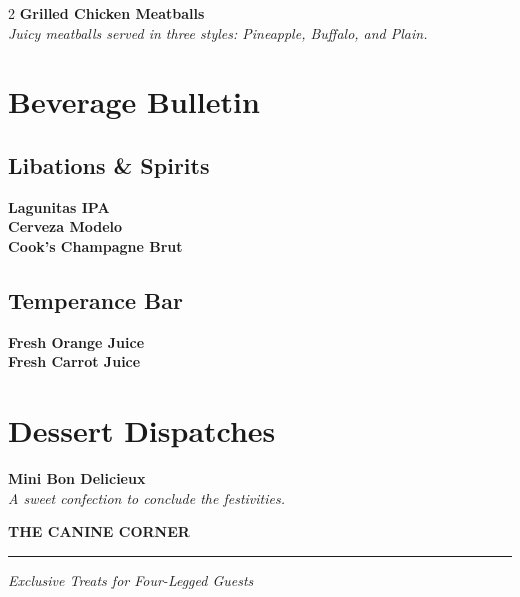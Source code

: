 \documentclass[a4paper,10pt]{article}
\begin{document}
\begin{multicols}{2}
    \vspace{0.1cm}
    \textbf{Grilled Chicken Meatballs} \\
    \textit{Juicy meatballs served in three styles: Pineapple, Buffalo, and Plain.}

    \vspace{0.4cm}

    \section{Beverage Bulletin}
    \vspace{0.2cm}

    \subsection{Libations & Spirits}
    \vspace{0.1cm}
    \textbf{Lagunitas IPA} \\
    \textbf{Cerveza Modelo} \\
    \textbf{Cook's Champagne Brut}

    \vspace{0.2cm}
    \subsection{Temperance Bar}
    \vspace{0.1cm}
    \textbf{Fresh Orange Juice} \\
    \textbf{Fresh Carrot Juice}

    \vspace{0.4cm}

    \section{Dessert Dispatches}
    \vspace{0.2cm}

    \textbf{Mini Bon Delicieux} \\
    \textit{A sweet confection to conclude the festivities.}

    \vspace{0.5cm}

    \begin{tcolorbox}[colback=white, colframe=black, sharp corners, boxrule=1pt, width=\linewidth]
        \centering
        \textbf{\large THE CANINE CORNER}
        \vspace{0.1cm}
        \hrule
        \vspace{0.1cm}
        \flushleft
        \textit{Exclusive Treats for Four-Legged Guests}


\end{tcolorbox}
\end{multicols}
\end{document}
